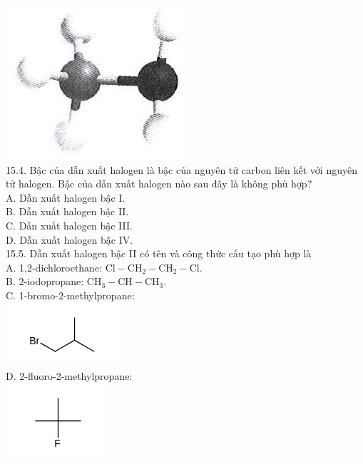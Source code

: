 \documentclass[10pt]{article}
\begin{document}
\includegraphics[max width=\textwidth, center]{2025_10_23_ae7aef68fb3b41082d29g-33(1)}\\
15.4. Bậc của dẫn xuất halogen là bậc của nguyên tử carbon liên kết với nguyên tử halogen. Bậc của dẫn xuất halogen nào sau đây là không phù hợp?\\
A. Dẫn xuất halogen bậc I.\\
B. Dẫn xuất halogen bậc II.\\
C. Dẫn xuất halogen bậc III.\\
D. Dẫn xuất halogen bậc IV.\\
15.5. Dẫn xuất halogen bậc II có tên và công thức cấu tạo phù hợp là\\
A. 1,2-dichloroethane: $\mathrm{Cl}-\mathrm{CH}_{2}-\mathrm{CH}_{2}-\mathrm{Cl}$.\\
B. 2-iodopropane: $\mathrm{CH}_{3}-\mathrm{CH}-\mathrm{CH}_{3}$.\\
C. 1-bromo-2-methylpropane:\\
\includegraphics{smile-ac1a670283b7cbb6c41be821d97b97e9eb68c9f3}\\
D. 2-fluoro-2-methylpropane:\\
\includegraphics{smile-8be15470ad2ab47b0ca06e54161aeb9263975501}\\
\end{document}
